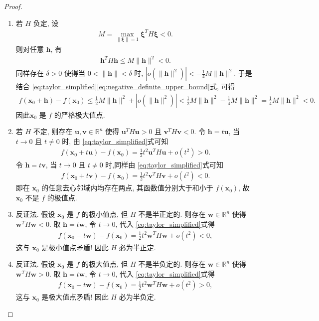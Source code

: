 \documentclass[../../main.tex]{subfiles}%
\begin{document}
\begin{proof}
\begin{enumerate}[(1)]
\item 若 \( H \) 负定, 设
\begin{align*}
M = \max_{\|\bm{\xi}\| = 1} \bm{\xi}^T H \bm{\xi} < 0.
\end{align*}
则对任意 \( \bm{h} \), 有
\begin{align}
\bm{h}^T H \bm{h} \leqslant M \|\bm{h}\|^2 < 0. \label{eq:negative_definite_upper_bound}
\end{align}
同样存在 \( \delta > 0 \) 使得当 \( 0 < \|\bm{h}\| < \delta \) 时, \( |o(\|\bm{h}\|^2)| < -\frac{1}{4} M \|\bm{h}\|^2 \). 于是结合 \eqref{eq:taylor_simplified}\eqref{eq:negative_definite_upper_bound}式, 可得
\begin{align*}
f(\bm{x}_0 + \bm{h}) - f(\bm{x}_0) \leqslant \frac{1}{2} M \|\bm{h}\|^2 + |o(\|\bm{h}\|^2)| 
< \frac{1}{2} M \|\bm{h}\|^2 - \frac{1}{4} M \|\bm{h}\|^2 
= \frac{1}{4} M \|\bm{h}\|^2 < 0.
\end{align*}
因此\( \bm{x}_0 \) 是 \( f \) 的严格极大值点.
\item 若 \( H \) 不定, 则存在 \( \bm{u}, \bm{v} \in \mathbb{R}^n \) 使得 \( \bm{u}^T H \bm{u} > 0 \) 且 \( \bm{v}^T H \bm{v} < 0 \). 令 \( \bm{h} = t \bm{u} \), 当 \( t \to 0 \) 且 \( t \neq 0 \) 时, 由 \eqref{eq:taylor_simplified}式可知
\begin{align*}
f(\bm{x}_0 + t \bm{u}) - f(\bm{x}_0) = \frac{1}{2} t^2 \bm{u}^T H \bm{u} + o(t^2) > 0.
\end{align*}
令 \( \bm{h} = t \bm{v} \), 当 \( t \to 0 \) 且 \( t \neq 0 \) 时,同样由 \eqref{eq:taylor_simplified}式可知
\begin{align*}
f(\bm{x}_0 + t \bm{v}) - f(\bm{x}_0) = \frac{1}{2} t^2 \bm{v}^T H \bm{v} + o(t^2) < 0.
\end{align*}
即在 \( \bm{x}_0 \) 的任意去心邻域内均存在两点, 其函数值分别大于和小于 \( f(\bm{x}_0) \), 故 \( \bm{x}_0 \) 不是 \( f \) 的极值点.
\item 反证法. 假设 \( \bm{x}_0 \) 是 \( f \) 的极小值点, 但 \( H \) 不是半正定的. 则存在 \( \bm{w} \in \mathbb{R}^n \) 使得 \( \bm{w}^T H \bm{w} < 0 \). 取 \( \bm{h} = t \bm{w} \), 令 \( t \to 0 \), 代入 \eqref{eq:taylor_simplified}式得
\begin{align*}
f(\bm{x}_0 + t \bm{w}) - f(\bm{x}_0) = \frac{1}{2} t^2 \bm{w}^T H \bm{w} + o(t^2) < 0,
\end{align*}
这与 \( \bm{x}_0 \) 是极小值点矛盾! 因此 \( H \) 必为半正定.

\item 反证法. 假设 \( \bm{x}_0 \) 是 \( f \) 的极大值点, 但 \( H \) 不是半负定的. 则存在 \( \bm{w} \in \mathbb{R}^n \) 使得 \( \bm{w}^T H \bm{w} > 0 \). 取 \( \bm{h} = t \bm{w} \), 令 \( t \to 0 \), 代入 \eqref{eq:taylor_simplified}式得
\begin{align*}
f(\bm{x}_0 + t \bm{w}) - f(\bm{x}_0) = \frac{1}{2} t^2 \bm{w}^T H \bm{w} + o(t^2) > 0,
\end{align*}
这与 \( \bm{x}_0 \) 是极大值点矛盾! 因此 \( H \) 必为半负定.
\end{enumerate}
\end{proof}
\end{document}
